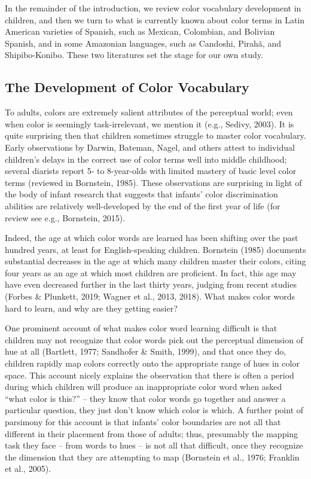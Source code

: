 \documentclass[
  ,apa7,floatsintext]{apa6}
\begin{document}
In the remainder of the introduction, we review color vocabulary development in children, and then we turn to what is currently known about color terms in Latin American varieties of Spanish, such as Mexican, Colombian, and Bolivian Spanish, and in some Amazonian languages, such as Candoshi, Pirahã, and Shipibo-Konibo. These two literatures set the stage for our own study.

\hypertarget{the-development-of-color-vocabulary}{%
\subsection{The Development of Color Vocabulary}\label{the-development-of-color-vocabulary}}

To adults, colors are extremely salient attributes of the perceptual world; even when color is seemingly task-irrelevant, we mention it (e.g., Sedivy, 2003). It is quite surprising then that children sometimes struggle to master color vocabulary. Early observations by Darwin, Bateman, Nagel, and others attest to individual children's delays in the correct use of color terms well into middle childhood; several diarists report 5- to 8-year-olds with limited mastery of basic level color terms (reviewed in Bornstein, 1985). These observations are surprising in light of the body of infant research that suggests that infants' color discrimination abilities are relatively well-developed by the end of the first year of life (for review see e.g., Bornstein, 2015).

Indeed, the age at which color words are learned has been shifting over the past hundred years, at least for English-speaking children. Bornstein (1985) documents substantial decreases in the age at which many children master their colors, citing four years as an age at which most children are proficient. In fact, this age may have even decreased further in the last thirty years, judging from recent studies (Forbes \& Plunkett, 2019; Wagner et al., 2013, 2018). What makes color words hard to learn, and why are they getting easier?

One prominent account of what makes color word learning difficult is that children may not recognize that color words pick out the perceptual dimension of hue at all (Bartlett, 1977; Sandhofer \& Smith, 1999), and that once they do, children rapidly map colors correctly onto the appropriate range of hues in color space. This account nicely explains the observation that there is often a period during which children will produce an inappropriate color word when asked ``what color is this?'' -- they know that color words go together and answer a particular question, they just don't know which color is which. A further point of parsimony for this account is that infants' color boundaries are not all that different in their placement from those of adults; thus, presumably the mapping task they face -- from words to hues -- is not all that difficult, once they recognize the dimension that they are attempting to map (Bornstein et al., 1976; Franklin et al., 2005).
\end{document}
